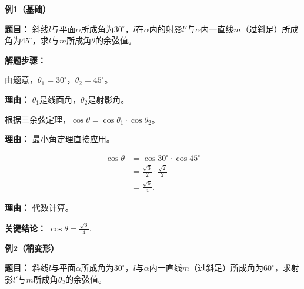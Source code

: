 \begin{examplebox}
	\textbf{\textcolor{CExample}{例1（基础）}}

	\textbf{\textcolor{CExample}{题目：}}
	斜线$l$与平面$\alpha$所成角为$30^{\circ}$，$l$在$\alpha$内的射影$l'$与$\alpha$内一直线$m$（过斜足）所成角为$45^{\circ}$，求$l$与$m$所成角$\theta$的余弦值。

	\textbf{\textcolor{CExample}{解题步骤：}}
	\begin{description}[style=nextline, leftmargin=2.8em, labelsep=0.5em, itemsep=0.45em]
		\item[\textbf{第一步（识别角大小）：}] 由题意，$\theta_1 = 30^{\circ}$，$\theta_2 = 45^{\circ}$。
			\par\textbf{理由：} $\theta_1$是线面角，$\theta_2$是射影角。
		\item[\textbf{第二步（套用定理）：}] 根据三余弦定理，$\cos\theta = \cos\theta_1 \cdot \cos\theta_2$。
			\par\textbf{理由：} 最小角定理直接应用。
		\item[\textbf{第三步（计算得结论）：}] \par
			\[
				\begin{aligned}
					\cos\theta &= \cos30^{\circ} \cdot \cos45^{\circ} \\
					&= \frac{\sqrt{3}}{2} \cdot \frac{\sqrt{2}}{2} \\
					&= \frac{\sqrt{6}}{4}.
			\end{aligned}
			\]
			\par\textbf{理由：} 代数计算。
	\end{description}

	\textbf{\textcolor{CExample}{关键结论：}}
	$\cos\theta = \frac{\sqrt{6}}{4}$.

	\medskip
	\textbf{\textcolor{CExample}{例2（稍变形）}}

	\textbf{\textcolor{CExample}{题目：}}
	斜线$l$与平面$\alpha$所成角为$30^{\circ}$，$l$与$\alpha$内一直线$m$（过斜足）所成角为$60^{\circ}$，求射影$l'$与$m$所成角$\theta_2$的余弦值。


\end{examplebox}
